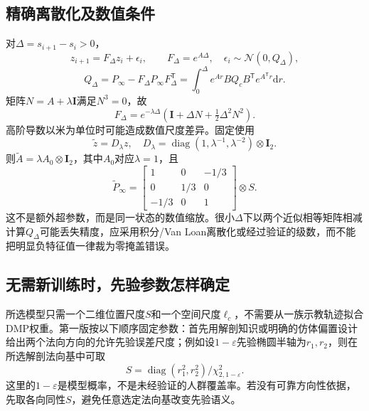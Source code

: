 \documentclass[UTF8,11pt,a4paper,fontset=fandol]{ctexart}
\numberwithin{equation}{section}
\theoremstyle{plain}
\theoremstyle{definition}
\theoremstyle{remark}
\DeclareMathOperator{\diag}{diag}\DeclareMathOperator{\rank}{rank}
\newcommand{\Normal}{\mathcal N}\newcommand{\dd}{\mathrm d}
\newcommand{\Id}{\mathbf I}\newcommand{\T}{^{\mathsf T}}
\begin{document}
\subsection{精确离散化及数值条件}
对$\Delta=s_{i+1}-s_i>0$，
\begin{equation}
 z_{i+1}=F_\Delta z_i+\epsilon_i,
 \qquad F_\Delta=e^{A\Delta},\quad
 \epsilon_i\sim\Normal(0,Q_\Delta),
\end{equation}
\begin{equation}
 \boxed{Q_\Delta=P_\infty-F_\Delta P_\infty F_\Delta\T
 =\int_0^\Delta e^{Ar}BQ_cB\T e^{A\T r}\dd r.}
 \label{eq:discretization}
\end{equation}
矩阵$N=A+\lambda\Id$满足$N^3=0$，故
\begin{equation}
 F_\Delta=e^{-\lambda\Delta}\left(\Id+\Delta N+\tfrac12\Delta^2N^2\right).
 \label{eq:transition-closed}
\end{equation}
高阶导数以米为单位时可能造成数值尺度差异。固定使用
\begin{equation}
 \widetilde z=D_\lambda z,\quad
 D_\lambda=\diag(1,\lambda^{-1},\lambda^{-2})\otimes\Id_2.
 \label{eq:state-scaling}
\end{equation}
则$\widetilde A=\lambda A_0\otimes\Id_2$，其中$A_0$对应$\lambda=1$，且
\begin{equation}
 \widetilde P_\infty=
 \begin{bmatrix}1&0&-1/3\\0&1/3&0\\-1/3&0&1\end{bmatrix}\otimes S.
\end{equation}
这不是额外超参数，而是同一状态的数值缩放。很小$\Delta$下以两个近似相等矩阵相减计算$Q_\Delta$可能丢失精度，应采用积分/Van Loan离散化或经过验证的级数，而不能把明显负特征值一律裁为零掩盖错误。


\subsection{无需新训练时，先验参数怎样确定}
所选模型只需一个二维位置尺度$S$和一个空间尺度$\ell_c$，不需要从一族示教轨迹拟合DMP权重。第一版按以下顺序固定参数：首先用解剖知识或明确的仿体偏置设计给出两个法向方向的允许先验误差尺度；例如设$1-\varepsilon$先验椭圆半轴为$r_1,r_2$，则在所选解剖法向基中可取
\begin{equation}
 S=\diag(r_1^2,r_2^2)/\chi^2_{2,1-\varepsilon}.
 \label{eq:prior-scale-choice}
\end{equation}
这里的$1-\varepsilon$是模型概率，不是未经验证的人群覆盖率。若没有可靠方向性依据，先取各向同性$S$，避免任意选定法向基改变先验语义。
\end{document}
